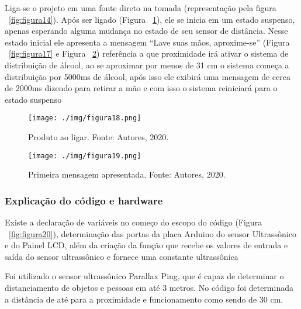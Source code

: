 \documentclass[10pt,twocolumn,letterpaper]{article}
\begin{document}
Liga-se o projeto em uma fonte direto na tomada  (representação pela figura  ~\ref{fig:figura14}). Após ser ligado (Figura ~\ref{fig:figura18}),  ele se inicia em um estado suspenso, apenas esperando alguma mudança no estado de seu sensor de distância. Nesse estado inicial ele apresenta a mensagem “Lave suas mãos, aproxime-se” (Figura  ~\ref{fig:figura17} e Figura ~\ref{fig:figura19}) referência a que proximidade irá ativar o sistema de distribuição de álcool, ao se aproximar por menos de 31 cm o sistema começa a distribuição por 5000ms de álcool, após isso ele exibirá uma mensagem de cerca de 2000ms dizendo para retirar a mão e com isso o sistema reiniciará para o estado suspenso

{
\begin{figure}[!h]
\begin{center}
   \texttt{[image: ./img/figura18.png]}
\end{center}
   \caption{  Produto ao ligar. Fonte: Autores, 2020.}
\label{fig:figura18}
\end{figure}
} 

{
\begin{figure}[!h]
\begin{center}
   \texttt{[image: ./img/figura19.png]}
\end{center}
   \caption{ Primeira mensagem apresentada. Fonte: Autores, 2020. }
\label{fig:figura19}
\end{figure}
} 

\subsubsection{Explicação do código e hardware}

Existe a declaração de variáveis no começo do escopo do código (Figura ~\ref{fig:figura20}), determinação das portas da placa Arduino do sensor Ultrassônico e do Painel LCD, além da criação da função que  recebe os valores de entrada e saída do sensor ultrassônico e fornece uma constante ultrassônica

Foi utilizado o sensor ultrassônico Parallax Ping, que é capaz de determinar o distanciamento de objetos e pessoas em até 3 metros. No código foi determinada a distância de até para a proximidade e funcionamento como sendo de 30 cm.
\end{document}

